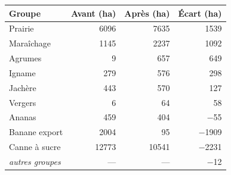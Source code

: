 \begin{tabular}{@{}lrrr@{}}
  \toprule
  \textbf{Groupe} & \textbf{Avant (ha)} & \textbf{Après (ha)} & \textbf{Écart (ha)} \\
  \midrule
  Prairie & \num{6096} & \num{7635} & \num{1539} \\
  Maraîchage & \num{1145} & \num{2237} & \num{1092} \\
  Agrumes & \num{9} & \num{657} & \num{649} \\
  Igname & \num{279} & \num{576} & \num{298} \\
  Jachère & \num{443} & \num{570} & \num{127} \\
  Vergers & \num{6} & \num{64} & \num{58} \\
  Ananas & \num{459} & \num{404} & \num{-55} \\
  Banane export & \num{2004} & \num{95} & \num{-1909} \\
  Canne à sucre & \num{12773} & \num{10541} & \num{-2231} \\
  \emph{autres groupes} & --- & --- & \num{-12} \\
  \bottomrule
\end{tabular}
